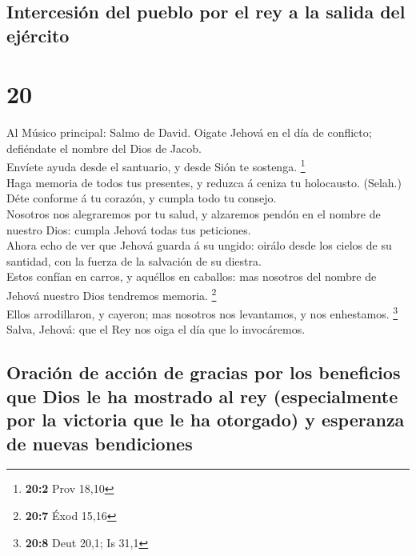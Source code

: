 \hypertarget{intercesiuxf3n-del-pueblo-por-el-rey-a-la-salida-del-ejuxe9rcito}{%
\subsection{Intercesión del pueblo por el rey a la salida del
ejército}\label{intercesiuxf3n-del-pueblo-por-el-rey-a-la-salida-del-ejuxe9rcito}}

\hypertarget{section-19}{%
\section{20}\label{section-19}}

 Al Músico principal: Salmo de David. Oigate Jehová en el
día de conflicto; defiéndate el nombre del Dios de Jacob.\\
 Envíete ayuda desde el santuario, y desde Sión te sostenga.
\footnote{\textbf{20:2} Prov 18,10}\\
 Haga memoria de todos tus presentes, y reduzca á ceniza tu
holocausto. (Selah.)\\
 Déte conforme á tu corazón, y cumpla todo tu consejo.\\
 Nosotros nos alegraremos por tu salud, y alzaremos pendón
en el nombre de nuestro Dios: cumpla Jehová todas tus peticiones.\\
 Ahora echo de ver que Jehová guarda á su ungido: oirálo
desde los cielos de su santidad, con la fuerza de la salvación de su
diestra.\\
 Estos confían en carros, y aquéllos en caballos: mas
nosotros del nombre de Jehová nuestro Dios tendremos memoria.
\footnote{\textbf{20:7} Éxod 15,16}\\
 Ellos arrodillaron, y cayeron; mas nosotros nos levantamos,
y nos enhestamos. \footnote{\textbf{20:8} Deut 20,1; Is 31,1}\\
 Salva, Jehová: que el Rey nos oiga el día que lo
invocáremos.

\hypertarget{oraciuxf3n-de-acciuxf3n-de-gracias-por-los-beneficios-que-dios-le-ha-mostrado-al-rey-especialmente-por-la-victoria-que-le-ha-otorgado-y-esperanza-de-nuevas-bendiciones}{%
\subsection{Oración de acción de gracias por los beneficios que Dios le
ha mostrado al rey (especialmente por la victoria que le ha otorgado) y
esperanza de nuevas
bendiciones}\label{oraciuxf3n-de-acciuxf3n-de-gracias-por-los-beneficios-que-dios-le-ha-mostrado-al-rey-especialmente-por-la-victoria-que-le-ha-otorgado-y-esperanza-de-nuevas-bendiciones}}

